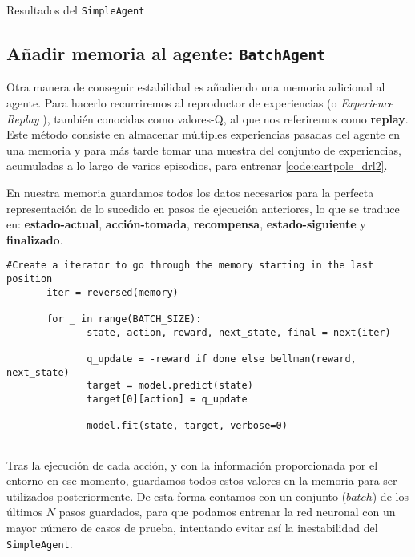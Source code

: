 %
       {Resultados del \texttt{SimpleAgent}}

\subsection{Añadir memoria al agente: \texttt{BatchAgent}}
\label{sec:cartpoledqn2}

Otra manera de conseguir estabilidad es añadiendo una memoria adicional al agente. Para hacerlo recurriremos al reproductor de experiencias (o \textit{Experience Replay} \citep{Lin1992}), también conocidas como valores-Q, al que nos referiremos como \textbf{replay}. Este método consiste en almacenar múltiples experiencias pasadas del agente en una memoria y para más tarde tomar una muestra del conjunto de experiencias, acumuladas a lo largo de varios episodios, para entrenar \ref{code:cartpole_drl2}.

En nuestra memoria guardamos todos los datos necesarios para la perfecta representación de lo sucedido en pasos de ejecución anteriores, lo que se traduce en: \textbf{estado-actual}, \textbf{acción-tomada}, \textbf{recompensa}, \textbf{estado-siguiente} y \textbf{finalizado}.

\begin{minipage}{0.9\linewidth}%
\begin{lstlisting}[frame=tb, caption=Pseudocódigo función Replay de BatchAgent, inputencoding=latin1, label=code:cartpole_drl2]
       #Create a iterator to go through the memory starting in the last position 
       iter = reversed(memory)
       
       for _ in range(BATCH_SIZE):
              state, action, reward, next_state, final = next(iter)

              q_update = -reward if done else bellman(reward, next_state)
              target = model.predict(state)
              target[0][action] = q_update

              model.fit(state, target, verbose=0)
              
\end{lstlisting}%
\end{minipage}

Tras la ejecución de cada acción, y con la información proporcionada por el entorno en ese momento, guardamos todos estos valores en la memoria para ser utilizados posteriormente. De esta forma contamos con un conjunto ($batch$) de los últimos $N$ pasos guardados, para que podamos entrenar la red neuronal con un mayor número de casos de prueba, intentando evitar así la inestabilidad del \texttt{SimpleAgent}.


